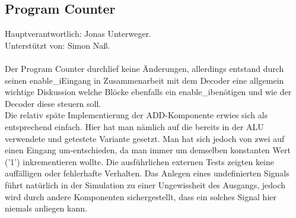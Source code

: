 \documentclass[bibliography=totoc,listof=totoc,index=totoc]{scrartcl}
\begin{document}
\subsection{Program Counter}
Hauptverantwortlich: Jonas Unterweger.\\
Unterstützt von: Simon Naß.\\\\
Der Program Counter durchlief keine Änderungen, allerdings entstand durch seinen \glqq enable\_i\grqq \space Eingang in Zusammenarbeit mit dem Decoder eine allgemein wichtige Diskussion welche Blöcke ebenfalls ein \glqq enable\_i\grqq \space benötigen und wie der Decoder diese steuern soll.\\
Die relativ späte Implementierung der ADD-Komponente erwies sich als entsprechend einfach. Hier hat man nämlich auf die bereits in der ALU verwendete und getestete Variante gesetzt. Man hat sich jedoch von zwei auf einen Eingang um-entschieden, da man immer um demselben konstanten Wert ('1') inkrementieren wollte. Die ausführlichen externen Tests zeigten keine auffälligen oder fehlerhafte Verhalten. Das Anlegen eines undefinierten Signals führt natürlich in der Simulation zu einer Ungewissheit des Ausgangs, jedoch wird durch andere Komponenten sichergestellt, dass ein solches Signal hier niemals anliegen kann.
\end{document}
